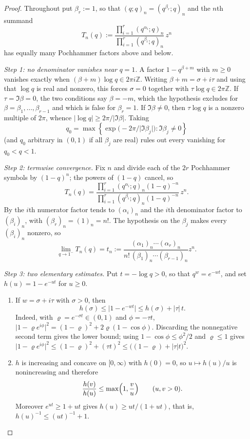 \documentclass[11pt,oneside,openany]{book}
\theoremstyle{definition}
\theoremstyle{remark}
\newcommand{\poch}[3]{(#1;#2)_{#3}}
\newcommand{\Z}{\mathbb Z}
\newcommand{\abs}[1]{\lvert #1\rvert}
\newcommand{\set}[1]{\left\{#1\right\}}
\newcommand{\defeq}{\mathrel{:=}}
\begin{document}
\begin{proof}
Throughout put $\beta_r\defeq1$, so that $\poch{q}{q}{n}=\poch{q^{\beta_r}}{q}{n}$ and the $n$th summand
\[
 T_n(q)\defeq
 \frac{\prod_{i=1}^{r}\poch{q^{\alpha_i}}{q}{n}}
      {\prod_{i=1}^{r}\poch{q^{\beta_i}}{q}{n}}\,z^n
\]
has equally many Pochhammer factors above and below.

\emph{Step 1: no denominator vanishes near $q=1$.}
A factor $1-q^{\beta+m}$ with $m\ge0$ vanishes exactly when $(\beta+m)\log q\in2\pi i\Z$.  Writing $\beta+m=\sigma+i\tau$ and using that $\log q$ is real and nonzero, this forces $\sigma=0$ together with $\tau\log q\in2\pi\Z$.  If $\tau=\Im\beta=0$, the two conditions say $\beta=-m$, which the hypothesis excludes for $\beta=\beta_1,\dots,\beta_{r-1}$ and which is false for $\beta_r=1$.  If $\Im\beta\ne0$, then $\tau\log q$ is a nonzero multiple of $2\pi$, whence $\abs{\log q}\ge2\pi/\abs{\Im\beta}$.  Taking
\[
 q_0=\max\set{\exp\!\bigl(-2\pi/\abs{\Im\beta_j}\bigr):\Im\beta_j\ne0}
\]
(and $q_0$ arbitrary in $(0,1)$ if all $\beta_j$ are real) rules out every vanishing for $q_0<q<1$.

\emph{Step 2: termwise convergence.}
Fix $n$ and divide each of the $2r$ Pochhammer symbols by $(1-q)^n$; the powers of $(1-q)$ cancel, so
\[
 T_n(q)=
 \frac{\prod_{i=1}^{r}\poch{q^{\alpha_i}}{q}{n}(1-q)^{-n}}
      {\prod_{i=1}^{r}\poch{q^{\beta_i}}{q}{n}(1-q)^{-n}}\,z^n .
\]
By  the $i$th numerator factor tends to $(\alpha_i)_n$ and the $i$th denominator factor to $(\beta_i)_n$, with $(\beta_r)_n=(1)_n=n!$.  The hypothesis on the $\beta_j$ makes every $(\beta_i)_n$ nonzero, so
\[
 \lim_{q\to1^-}T_n(q)=t_n\defeq
 \frac{(\alpha_1)_n\cdots(\alpha_r)_n}
      {n!\,(\beta_1)_n\cdots(\beta_{r-1})_n}z^n .
\]

\emph{Step 3: two elementary estimates.}
Put $t=-\log q>0$, so that $q^{w}=e^{-wt}$, and set $h(u)=1-e^{-ut}$ for $u\ge0$.
\begin{enumerate}[label=\textup{(\alph*)}]
\item If $w=\sigma+i\tau$ with $\sigma>0$, then
\[
 h(\sigma)\le\abs{1-e^{-wt}}\le h(\sigma)+\abs\tau\,t .
\]
Indeed, with $\varrho=e^{-\sigma t}\in(0,1)$ and $\phi=-\tau t$,
$\abs{1-\varrho e^{i\phi}}^2=(1-\varrho)^2+2\varrho(1-\cos\phi)$.  Discarding the nonnegative second term gives the lower bound; using $1-\cos\phi\le\phi^2/2$ and $\varrho\le1$ gives $\abs{1-\varrho e^{i\phi}}^2\le(1-\varrho)^2+(\tau t)^2\le\bigl((1-\varrho)+\abs\tau t\bigr)^2$.
\item $h$ is increasing and concave on $[0,\infty)$ with $h(0)=0$, so $u\mapsto h(u)/u$ is nonincreasing and therefore
\[
 \frac{h(v)}{h(u)}\le\max\Bigl(1,\frac vu\Bigr)\qquad(u,v>0).
\]
Moreover $e^{ut}\ge1+ut$ gives $h(u)\ge ut/(1+ut)$, that is, $h(u)^{-1}\le(ut)^{-1}+1$.
\end{enumerate}


\end{proof}
\end{document}
